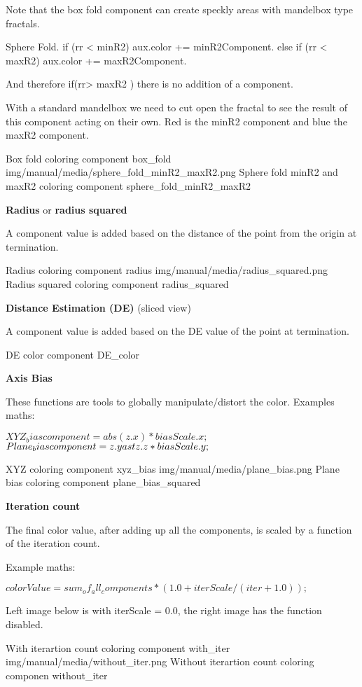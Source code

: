 Note that the box fold component can create  speckly areas with mandelbox type fractals.

Sphere Fold. 
if (rr < minR2)    aux.color +=  minR2Component.
else if (rr < maxR2)    aux.color +=  maxR2Component.

And therefore  if(rr> maxR2 ) there is no addition of a component.

With a standard mandelbox we need to cut open the fractal to see the result of this component acting on their own. Red is the minR2 component and blue the maxR2 component.


{Box fold coloring component}
{box_fold}
{img/manual/media/sphere_fold_minR2_maxR2.png}
{Sphere fold minR2 and maxR2 coloring component}
{sphere_fold_minR2_maxR2}


\textbf{Radius} or \textbf{radius squared} 

A  component value is added based on the distance of the point from the origin at termination.


{Radius coloring component}
{radius}
{img/manual/media/radius_squared.png}
{Radius squared coloring component}
{radius_squared}

\textbf{Distance Estimation (DE)}  (sliced view)

A  component value is added based on the DE value of the point at termination.

{DE color component}
{DE_color}

\textbf{Axis Bias}

These functions are tools to globally manipulate/distort the color. 
Examples maths:

$XYZ_bias                component = abs(z.x) \ast biasScale.x;$
$Plane_bias              component = z.y \\ast z.z \ast biasScale.y;$

{XYZ coloring component}
{xyz_bias}
{img/manual/media/plane_bias.png}
{Plane bias coloring component}
{plane_bias_squared}

\textbf{Iteration count}

The final color value, after adding up all the components, is  scaled by a function of the iteration count.

Example maths:

$colorValue =  sum_of_all_components *  ( 1.0 + iterScale / ( iter + 1.0));$

Left image below is with iterScale = 0.0, the right image has the function disabled.

{With iterartion count coloring component}
{with_iter}
{img/manual/media/without_iter.png}
{Without iterartion count coloring componen}
{without_iter}



